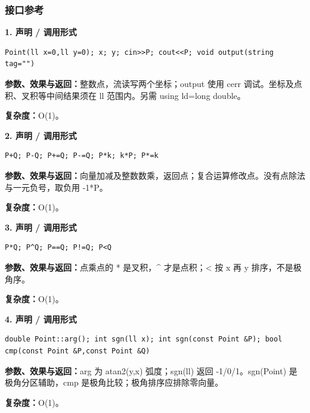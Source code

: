 \documentclass[UTF8,a4paper,10pt]{ctexart}
\begin{document}
\subsubsection*{接口参考}
\noindent\begin{minipage}{\textwidth}
\textbf{1. 声明 / 调用形式}
\begin{lstlisting}
Point(ll x=0,ll y=0); x; y; cin>>P; cout<<P; void output(string tag="")
\end{lstlisting}
\textbf{参数、效果与返回：}整数点，流读写两个坐标；output 使用 cerr 调试。坐标及点积、叉积等中间结果须在 ll 范围内。另需 using ld=long double。

\textbf{复杂度：}O(1)。

\end{minipage}\par\vspace{0.4em}
\noindent\begin{minipage}{\textwidth}
\textbf{2. 声明 / 调用形式}
\begin{lstlisting}
P+Q; P-Q; P+=Q; P-=Q; P*k; k*P; P*=k
\end{lstlisting}
\textbf{参数、效果与返回：}向量加减及整数数乘，返回点；复合运算修改点。没有点除法与一元负号，取负用 -1*P。

\textbf{复杂度：}O(1)。

\end{minipage}\par\vspace{0.4em}
\noindent\begin{minipage}{\textwidth}
\textbf{3. 声明 / 调用形式}
\begin{lstlisting}
P*Q; P^Q; P==Q; P!=Q; P<Q
\end{lstlisting}
\textbf{参数、效果与返回：}点乘点的 * 是叉积，\textasciicircum{} 才是点积；< 按 x 再 y 排序，不是极角序。

\textbf{复杂度：}O(1)。

\end{minipage}\par\vspace{0.4em}
\noindent\begin{minipage}{\textwidth}
\textbf{4. 声明 / 调用形式}
\begin{lstlisting}
double Point::arg(); int sgn(ll x); int sgn(const Point &P); bool cmp(const Point &P,const Point &Q)
\end{lstlisting}
\textbf{参数、效果与返回：}arg 为 atan2(y,x) 弧度；sgn(ll) 返回 -1/0/1。sgn(Point) 是极角分区辅助，cmp 是极角比较；极角排序应排除零向量。

\textbf{复杂度：}O(1)。

\end{minipage}\par\vspace{0.4em}
\end{document}
